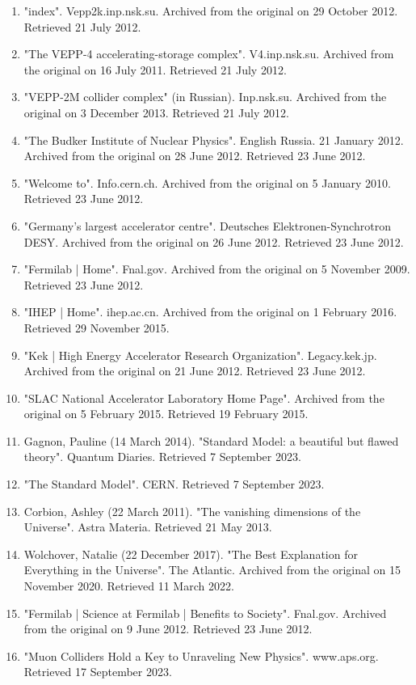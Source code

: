 \begin{enumerate}
\item "index". Vepp2k.inp.nsk.su. Archived from the original on 29 October 2012. Retrieved 21 July 2012.
\item "The VEPP-4 accelerating-storage complex". V4.inp.nsk.su. Archived from the original on 16 July 2011. Retrieved 21 July 2012.
\item "VEPP-2M collider complex" (in Russian). Inp.nsk.su. Archived from the original on 3 December 2013. Retrieved 21 July 2012.
\item "The Budker Institute of Nuclear Physics". English Russia. 21 January 2012. Archived from the original on 28 June 2012. Retrieved 23 June 2012.
\item "Welcome to". Info.cern.ch. Archived from the original on 5 January 2010. Retrieved 23 June 2012.
\item "Germany's largest accelerator centre". Deutsches Elektronen-Synchrotron DESY. Archived from the original on 26 June 2012. Retrieved 23 June 2012.
\item "Fermilab | Home". Fnal.gov. Archived from the original on 5 November 2009. Retrieved 23 June 2012.
\item "IHEP | Home". ihep.ac.cn. Archived from the original on 1 February 2016. Retrieved 29 November 2015.
\item "Kek | High Energy Accelerator Research Organization". Legacy.kek.jp. Archived from the original on 21 June 2012. Retrieved 23 June 2012.
\item "SLAC National Accelerator Laboratory Home Page". Archived from the original on 5 February 2015. Retrieved 19 February 2015.
\item Gagnon, Pauline (14 March 2014). "Standard Model: a beautiful but flawed theory". Quantum Diaries. Retrieved 7 September 2023.
\item "The Standard Model". CERN. Retrieved 7 September 2023.
\item Corbion, Ashley (22 March 2011). "The vanishing dimensions of the Universe". Astra Materia. Retrieved 21 May 2013.
\item Wolchover, Natalie (22 December 2017). "The Best Explanation for Everything in the Universe". The Atlantic. Archived from the original on 15 November 2020. Retrieved 11 March 2022.
\item "Fermilab | Science at Fermilab | Benefits to Society". Fnal.gov. Archived from the original on 9 June 2012. Retrieved 23 June 2012.
\item "Muon Colliders Hold a Key to Unraveling New Physics". www.aps.org. Retrieved 17 September 2023.
\end{enumerate}